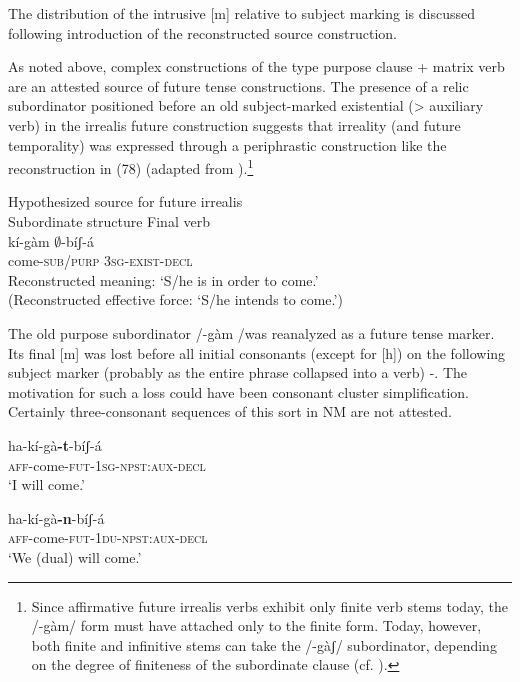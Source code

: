 \documentclass[output=paper]{langsci/langscibook}
\begin{document}
The distribution of the intrusive [m] relative to subject marking is discussed following introduction of the reconstructed source construction. 

As noted above, complex constructions of the type purpose clause + matrix verb are an attested source of future tense constructions. The presence of a relic subordinator positioned before an old subject-marked existential ({\textgreater} auxiliary verb) in the irrealis future construction suggests that irreality (and future temporality) was expressed through a periphrastic construction like the reconstruction in (78) (adapted from \citealt[11]{Ahland2014b}).\footnote{Since affirmative future irrealis verbs exhibit only finite verb stems today, the /-gàm/ form must have attached only to the finite form. Today, however, both finite and infinitive stems can take the /-gàʃ/ subordinator, depending on the degree of finiteness of the subordinate clause (cf. \citealt[629]{Ahland2012}).}

\ea\label{ex:mahland:78}
Hypothesized source for future irrealis\\
Subordinate structure   Final verb\\
\gll  kí{}-gàm        ${\emptyset}${}-bíʃ-{\downstep}á\\
  come-\textsc{sub/purp}    \textsc{3sg-exist-decl} \\
  \glt Reconstructed meaning: `S/he is in order to come.'\\
  (Reconstructed effective force: `S/he intends to come.') 
  \z
  
  The old purpose subordinator /{}-gàm /was reanalyzed as a future tense marker. Its final [m] was lost before all initial consonants (except for [h]) on the following subject marker (probably as the entire phrase collapsed into a verb) -. The motivation for such a loss could have been consonant cluster simplification. Certainly three-consonant sequences of this sort in NM are not attested. 

\ea\label{ex:mahland:79}
\gll ha-kí-gà\textbf{{}-t}{}-bíʃ-á \\
\textsc{aff}{}-come-\textsc{fut-1sg-npst:aux-decl} \\
\glt `I will come.'
\z

\ea\label{ex:mahland:80}
\gll ha-kí-gà\textbf{{}-n}{}-bíʃ-á \\
\textsc{aff}{}-come-\textsc{fut-1du-npst:aux-decl} \\
\glt `We (dual) will come.'
\z
\end{document}
